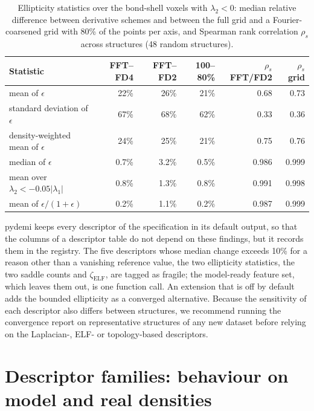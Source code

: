 \documentclass[11pt,a4paper]{article}
\begin{document}
\begin{table}[htbp]
\centering
\caption{Ellipticity statistics over the bond-shell voxels with
$\lambda_2<0$: median relative difference between derivative schemes and
between the full grid and a Fourier-coarsened grid with 80\% of the points per
axis, and Spearman rank correlation $\rho_s$ across structures (48 random
structures).}
\label{tab:ellipticity}
\begin{tabular}{lrrrrr}
\toprule
Statistic & FFT--FD4 & FFT--FD2 & 100--80\% & $\rho_s$ FFT/FD2 & $\rho_s$ grid \\
\midrule
mean of $\epsilon$ & 22\% & 26\% & 21\% & 0.68 & 0.73 \\
standard deviation of $\epsilon$ & 67\% & 68\% & 62\% & 0.33 & 0.36 \\
density-weighted mean of $\epsilon$ & 24\% & 25\% & 21\% & 0.75 & 0.76 \\
median of $\epsilon$ & 0.7\% & 3.2\% & 0.5\% & 0.986 & 0.999 \\
mean over $\lambda_2<-0.05|\lambda_1|$ & 0.8\% & 1.3\% & 0.8\% & 0.991 & 0.998 \\
mean of $\epsilon/(1+\epsilon)$ & 0.2\% & 1.1\% & 0.2\% & 0.987 & 0.999 \\
\bottomrule
\end{tabular}
\end{table}

pydemi keeps every descriptor of the specification in its default output, so
that the columns of a descriptor table do not depend on these findings, but it
records them in the registry. The five descriptors whose median change exceeds
10\% for a reason other than a vanishing reference value, the two ellipticity
statistics, the two saddle counts and $\zeta_{\mathrm{ELF}}$, are tagged as
fragile; the model-ready
feature set, which leaves them out, is one function call. An extension that is
off by default adds the bounded ellipticity as a converged alternative. Because
the sensitivity of each descriptor also differs between structures, we
recommend running the convergence report on representative structures of any
new dataset before relying on the Laplacian-, ELF- or topology-based
descriptors.

\section{Descriptor families: behaviour on model and real densities}
\label{sec:si-families}
\end{document}

